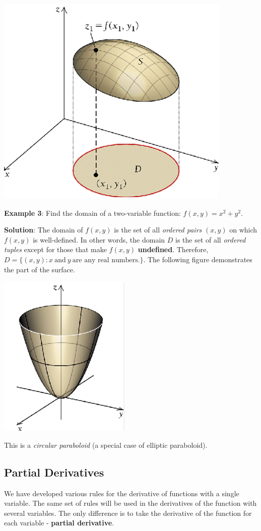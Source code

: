 \documentclass[
]{book}
\begin{document}
\begin{center}\includegraphics[width=0.45\linewidth]{img13/w13-3DFunction} \end{center}

\hfill\break

\textbf{Example 3}: Find the domain of a two-variable function: \(f(x,y) = x^2+ y^2\).

\textbf{Solution}: The domain of \(f(x,y)\) is the set of all \emph{ordered pairs} \((x,y)\) on which \(f(x,y)\) is well-defined. In other words, the domain \(D\) is the set of all \emph{ordered tuples} except for those that make \(f(x,y)\) \textbf{undefined}. Therefore, \(D = \{(x,y): x~\text{and}~y ~\text{are any real numbers.} \}\). The following figure demonstrates the part of the surface.

\begin{center}\includegraphics[width=0.3\linewidth]{img13/w13-circularParaboloid} \end{center}

This is a \emph{circular paraboloid} (a special case of elliptic paraboloid).

\hfill\break

\hypertarget{partial-derivatives}{%
\subsection{Partial Derivatives}\label{partial-derivatives}}

We have developed various rules for the derivative of functions with a single variable. The same set of rules will be used in the derivatives of the function with several variables. The only difference is to take the derivative of the function for each variable - \textbf{partial derivative}.
\end{document}
